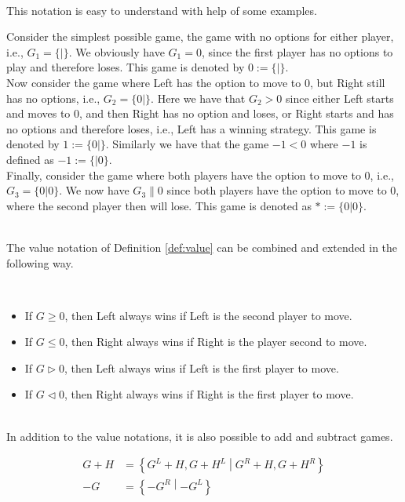 ~\\
This notation is easy to understand with help of some examples.
\begin{ex}{}
Consider the simplest possible game, the game with no options for either player, i.e., $G_1=\{|\}$. We obviously have $G_1=0$, since the first player has no options to play and therefore loses. This game is denoted by $0:=\{|\}$.
\\
Now consider the game where Left has the option to move to $0$, but Right still has no options, i.e., $G_2=\{0|\}$. Here we have that $G_2>0$ since either Left starts and moves to $0$, and then Right has no option and loses, or Right starts and has no options and therefore loses, i.e., Left has a winning strategy. This game is denoted by $1:=\{0|\}$. Similarly we have that the game $-1<0$ where $-1$ is defined as $-1:=\{|0\}$.
\\
Finally, consider the game where both players have the option to move to $0$, i.e., $G_3=\{0|0\}$. We now have $G_3\parallel0$ since both players have the option to move to $0$, where the second player then will lose. This game is denoted as $*:=\{0|0\}$.
\end{ex}
~\\
The value notation of Definition \ref{def:value} can be combined and extended in the following way.
\begin{defn}
\label{def:extvalue}~
\begin{itemize}
\item If $G\ge0$, then Left always wins if Left is the second player to move.
\item If $G\le0$, then Right always wins if Right is the player second to move.
\item If $G\rhd0$, then Left always wins if Left is the first player to move.
\item If $G\lhd0$, then Right always wins if Right is the first player to move.
\end{itemize}
\end{defn}
~\\
In addition to the value notations, it is also possible to add and subtract games.
\begin{defn}
\begin{align*}
G+H&=\left\{G^L+H,G+H^L\middle|G^R+H,G+H^R\right\}\\
-G&=\left\{-G^R\middle|-G^L\right\}
\end{align*}
\end{defn}
